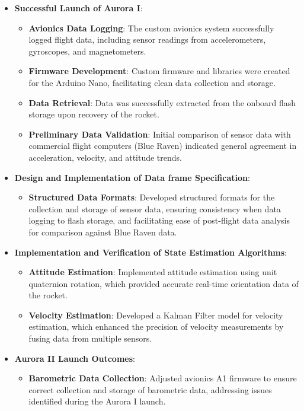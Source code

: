 \begin{itemize}
    \item \textbf{Successful Launch of Aurora I}:
    \begin{itemize}
        \item \textbf{Avionics Data Logging}: The custom avionics system successfully logged flight data, including sensor readings from accelerometers, gyroscopes, and magnetometers.
        \item \textbf{Firmware Development}: Custom firmware and libraries were created for the Arduino Nano, facilitating clean data collection and storage.
        \item \textbf{Data Retrieval}: Data was successfully extracted from the onboard flash storage upon recovery of the rocket.
        \item \textbf{Preliminary Data Validation}: Initial comparison of sensor data with commercial flight computers (Blue Raven) indicated general agreement in acceleration, velocity, and attitude trends.
    \end{itemize}
    \item \textbf{Design and Implementation of Data frame Specification}:
\begin{itemize}
        \item \textbf{Structured Data Formats}: Developed structured formats for the collection and storage of sensor data, ensuring consistency when data logging to flash storage, and facilitating ease of post-flight data analysis for comparison against Blue Raven data.
\end{itemize}
    \item \textbf{Implementation and Verification of State Estimation Algorithms}:
    \begin{itemize}
        \item \textbf{Attitude Estimation}: Implemented attitude estimation using unit quaternion rotation, which provided accurate real-time orientation data of the rocket.
        \item \textbf{Velocity Estimation}: Developed a Kalman Filter model for velocity estimation, which enhanced the precision of velocity measurements by fusing data from multiple sensors.
    \end{itemize}
    \item \textbf{Aurora II Launch Outcomes}:
    \begin{itemize}
        \item \textbf{Barometric Data Collection}: Adjusted avionics A1 firmware to ensure correct collection and storage of barometric data, addressing issues identified during the Aurora I launch.

\end{itemize}
\end{itemize}
